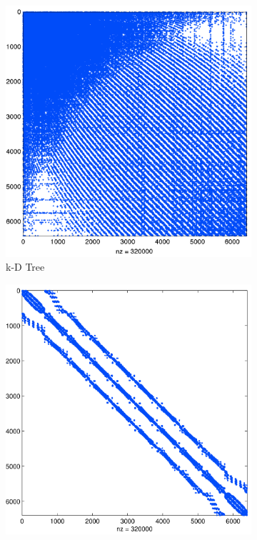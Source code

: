 \begin{figure}
\centering
\begin{subfigure}{0.425\textwidth}
\includegraphics[width=1.0\textwidth]{../figures/chapter7/bruteforce_N6400_n50-eps-converted-to.png}
\caption{k-D Tree} 
\end{subfigure} 
\begin{subfigure}{0.425\textwidth}
\includegraphics[width=1.0\textwidth]{../figures/chapter7/lsh_N6400_n50-eps-converted-to.png}

\end{subfigure}
\end{figure}
